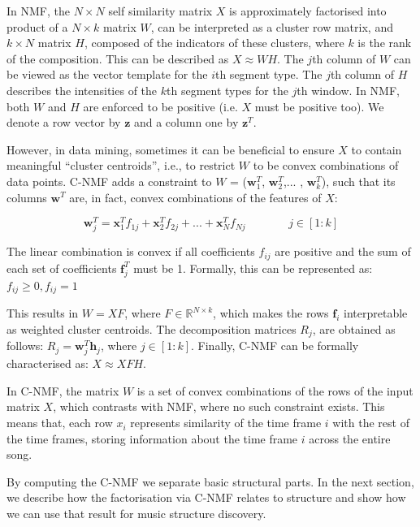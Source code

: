 In NMF, the $N \times N$ self similarity matrix $X$ is approximately factorised into product of a $N \times k$ matrix $W$, can be interpreted as a cluster row matrix, and $k \times N$ matrix $H$, composed of the indicators of these clusters, where $k$ is the rank of the composition. This can be described as $X \approx WH$. The $j$th column of $W$ can be viewed as the vector template for the $i$th segment type. The $j$th column of $H$ describes the intensities of the $k$th segment types for the $j$th window. In NMF, both $W$ and $H$ are enforced to be positive (i.e. $X$ must be positive too). We denote a row vector by $\boldsymbol{z}$ and a column one by $\boldsymbol{z}^{T}$.

However, in data mining, sometimes it can be beneficial to ensure $X$ to contain meaningful “cluster centroids”, i.e., to restrict $W$ to be convex combinations of data points.
C-NMF adds a constraint to $W$ = ($\boldsymbol{w}_{1}^{T}$, $\boldsymbol{w}_{2}^{T}$,... ,  $\boldsymbol{w}_{k}^{T}$),  such that its columns  $\boldsymbol{w}^{T}$  are, in fact,  convex combinations of the features of $X$:

\begin{equation}
\boldsymbol{w}_{j}^{T} = \boldsymbol{x}_{1}^{T}f_{1j} + \boldsymbol{x}_{2}^{T}f_{2j} + ... + \boldsymbol{x}_{N}^{T}f_{Nj}  \hspace{45pt}   j \in [1 : k]
\end{equation}

The linear combination is convex if all coefficients $f_{ij}$ are positive and the sum of each set of coefficients  $\boldsymbol{f}^{T}_{j}$ must be 1. Formally, this can be represented as:
$f_{ij} \geq 0,  f_{ij} = 1 $

This results in $W = XF$, where $F \in \mathbb{R}^{N \times k}$, which makes the rows $\boldsymbol{f}_{i}$ interpretable as weighted cluster centroids. The decomposition matrices $R_{j}$, are obtained as follows:  $R_{j} =  \boldsymbol{w}^{T}_{j}\boldsymbol{h}_{j}$, where $j \in [1 : k]$. Finally, C-NMF can be formally characterised as: $X \approx XFH$.

In C-NMF, the matrix $W$ is a set of convex combinations of the rows of the input matrix $X$, which contrasts with NMF, where no such constraint exists. This means that, each row $x_{i}$ represents similarity of the time frame $i$ with the rest of the time frames, storing information about the time frame $i$ across the entire song.

By computing the C-NMF we separate basic structural parts. In the next section, we describe how the factorisation via C-NMF relates to structure and show how we can use that result for music structure discovery. 


